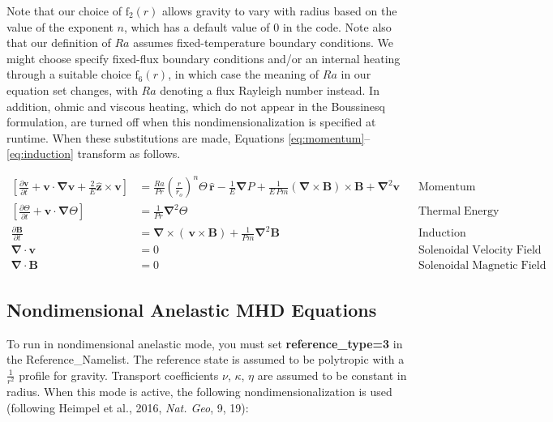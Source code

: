\documentclass[10pt,letterpaper]{article}
\newcommand{\ff}{\mathrm{f}}
\begin{document}
Note that our choice of $\ff_2(r)$ allows gravity to vary with radius based on the value of the exponent $n$, which has a default value of 0 in the code.  Note also that our definition of $Ra$ assumes fixed-temperature boundary conditions.  We might choose specify fixed-flux boundary conditions and/or an internal heating through a suitable choice $\ff_6(r)$, in which case the meaning of $Ra$ in our equation set changes, with $Ra$ denoting a flux Rayleigh number instead.  In addition, ohmic and viscous heating, which do not appear in the Boussinesq formulation, are turned off when this nondimensionalization is specified at runtime.   When these substitutions are made, Equations \ref{eq:momentum}--\ref{eq:induction} transform as follows.

\begin{align*}
    \left[\frac{\partial \boldsymbol{v}}{\partial t}  + \boldsymbol{v}\cdot\boldsymbol{\nabla}\boldsymbol{v}  %
     + \frac{2}{E}\boldsymbol{\hat{z}}\times\boldsymbol{v} \right]  &= %
    \frac{Ra}{Pr}\left(\frac{r}{r_o}\right)^n\Theta\,\boldsymbol{\hat{r}} %
     - \frac{1}{E}\boldsymbol{\nabla}P %
     + \frac{1}{E\,Pm}\left(\boldsymbol{\nabla}\times\boldsymbol{B}\right)\times\boldsymbol{B} %
     + \boldsymbol{\nabla}^2\boldsymbol{v} \;\;\; &\mathrm{Momentum}\\
    \left[\frac{\partial \Theta}{\partial t}  + \boldsymbol{v}\cdot\boldsymbol{\nabla}\Theta \right] &=
    \frac{1}{Pr}\boldsymbol{\nabla}^2\Theta  &\mathrm{Thermal\; Energy}\\ %
    \frac{\partial \boldsymbol{B}}{\partial t} &= \boldsymbol{\nabla}\times\left(\,\boldsymbol{v}\times\boldsymbol{B}\right)+\frac{1}{Pm}\boldsymbol{\nabla}^2\boldsymbol{B} &\mathrm{Induction} \\
    \boldsymbol{\nabla}\cdot\boldsymbol{v}&=0 &\mathrm{Solenoidal\; Velocity\; Field}\\
    \boldsymbol{\nabla}\cdot\boldsymbol{B}&=0 &\mathrm{Solenoidal\; Magnetic\; Field}
\end{align*}


\subsection{Nondimensional Anelastic MHD Equations}
To run in nondimensional anelastic mode, you must set \textbf{reference\_type=3} in the Reference\_Namelist.  The reference state is assumed to be polytropic with a $\frac{1}{r^2}$ profile for gravity.  Transport coefficients $\nu$, $\kappa$, $\eta$ are assumed to be constant in radius.   When this mode is active, the following nondimensionalization is used (following Heimpel et al., 2016, \textit{Nat. Geo}, 9, 19):
\end{document}
